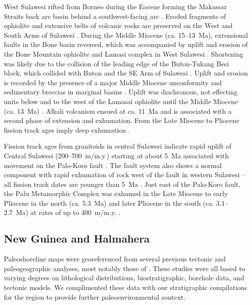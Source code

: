 \documentclass[11pt,letterpaper]{article}
\begin{document}
West Sulawesi rifted from Borneo during the Eocene forming the Makassar Straits back arc basin behind a southwest-facing arc \citep{Polve1997a}. Eroded fragments of ophiolite and extensive belts of volcanic rocks are preserved on the West and South Arms of Sulawesi \citep{Bergman1996a, vanLeeuwen2010a}. During the Middle Miocene (ca. 15--13~Ma), extensional faults in the Bone basin reversed, which was accompanied by uplift and erosion of the Bone Mountain ophiolite and Lamasi complex in West Sulawesi \citep{Bergman1996a, vanLeeuwen2010a}. Shortening was likely due to the collision of the leading edge of the Buton-Tukang Besi block, which collided with Buton and the SE Arm of Sulawesi \citep{Smith1991a}. Uplift and erosion is recorded by the presence of a major Middle Miocene unconformity and sedimentary breccias in marginal basins \citep{Bergman1996a, vanLeeuwen2010a}. Uplift was diachronous, not effecting units below and to the west of the Lamasai ophiolite until the Middle Miocene (ca. 13~Ma) \citep{vanLeeuwen2010a}. Alkali volcanism ensued at ca. 11~Ma and is associated with a second phase of extension and exhumation. From the Late Miocene to Pliocene fission track ages imply deep exhumation \citep{Smith1991a, Bergman1996a, vanLeeuwen2010a}.

Fission track ages from granitoids in central Sulawesi indicate rapid uplift of Central Sulawesi (200--700~m/m.y.) starting at about 5~Ma associated with movement on the Palo-Koro fault \citep{Bellier2006a}. The fault system also shows a normal component with rapid exhumation of rock west of the fault in western Sulawesi -- all fission track dates are younger than 5~Ma \citep{Bellier2006a}. Just east of the Palo-Koro fault, the Palu Metamorphic Complex was exhumed in the Late Miocene to early Pliocene in the north (ca. 5.3~Ma) and later Pliocene in the south (ca. 3.1--2.7~Ma) at rates of up to 400~m/m.y. \citep{Hennig2017b}.

\subsection*{New Guinea and Halmahera}

Paleoshoreline maps were georeferenced from several previous tectonic and paleogeographic analyses, most notably those of \citet{Nichols1991a, Cloos2005a, Gold2017a, Harrington2017a}. These studies were all based to varying degrees on lithological distributions, biostratigraphic, borehole data, and tectonic models. We complimented these data with our stratigraphic compilations for the region to provide further paleoenvironmental context.
\end{document}

